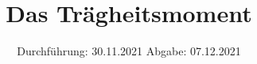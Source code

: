 

\subject{V 101}
\title{Das Trägheitsmoment}
\date{%
  Durchführung: 30.11.2021
  \hspace{3em}
  Abgabe: 07.12.2021
}



\maketitle
\thispagestyle{empty}
\tableofcontents
\newpage






%


\printbibliography{}


